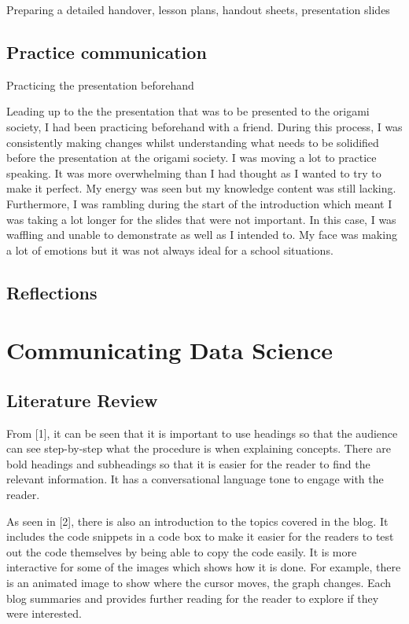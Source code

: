 \documentclass[12pt, a4paper,oneside]{book}
\numberwithin{equation}{section}
\begin{document}
Preparing a detailed handover, lesson plans, handout sheets, presentation slides

\section{Practice communication}\label{sec:x.x}

Practicing the presentation beforehand

Leading up to the the presentation that was to be presented to the origami society, I had been practicing beforehand with a friend. During this process, I was consistently making changes whilst understanding what needs to be solidified before the presentation at the origami society. I was moving a lot to practice speaking. It was more overwhelming than I had thought as I wanted to try to make it perfect. My energy was seen but my knowledge content was still lacking. Furthermore, I was rambling during the start of the introduction which meant I was taking a lot longer for the slides that were not important. In this case, I was waffling and unable to demonstrate as well as I intended to. My face was making a lot of emotions but it was not always ideal for a school situations.

\section{Reflections}\label{sec:x.x}

\chapter{Communicating Data Science}\label{ch:x}


\section{Literature Review}
From [1], it can be seen that it is important to use headings so that the audience can see step-by-step what the procedure is when explaining concepts. There are bold headings and subheadings so that it is easier for the reader to find the relevant information. It has a conversational language tone to engage with the reader.

As seen in [2], there is also an introduction to the topics covered in the blog. It includes the code snippets in a code box to make it easier for the readers to test out the code themselves by being able to copy the code easily. It is more interactive for some of the images which shows how it is done. For example, there is an animated image to show where the cursor moves, the graph changes. Each blog summaries and provides further reading for the reader to explore if they were interested.
\end{document}
